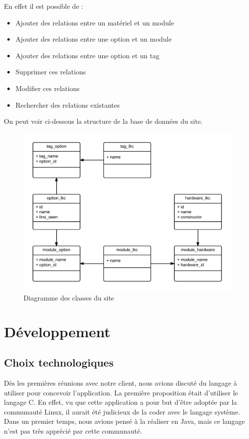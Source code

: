 \documentclass[17pts]{report}
\begin{document}
En effet il est possible de : \\


\begin{itemize}
    \item Ajouter des relations entre un matériel et un module
    \item Ajouter des relations entre une option et un module
    \item Ajouter des relations entre une option et un tag
    \item Supprimer ces relations
    \item Modifier ces relations
    \item Rechercher des relations existantes
\end{itemize}

On peut voir ci-dessous la structure de la base de données du site. \\

\begin{figure}[H]
    \includegraphics[scale=0.2]{./illustrations/diagramme_classes_site.png}
    \centering
    \caption{Diagramme des classes du site}
    \label{fig:DiagSite}
\end{figure}


\chapter{Développement}\thispagestyle{IHA-fancy-style}
\label{cha:Développement}
\section{Choix technologiques}
\label{sec:Choix technologiques}
Dès les premières réunions avec notre client, nous avions discuté du langage à
utiliser pour concevoir l'application. La première proposition était d'utiliser
le langage C. En effet, vu que cette application a pour but d'être adoptée par
la communauté Linux, il aurait été judicieux de la coder avec le langage
système. Dans un premier temps, nous avions pensé à la réaliser en Java, mais
ce langage n'est pas très apprécié par cette communauté.  \\
\end{document}
